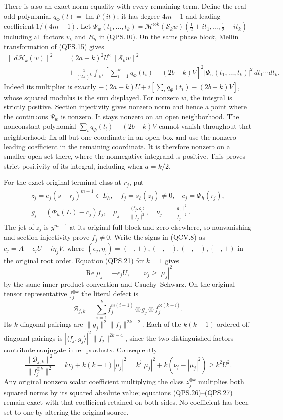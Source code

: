 There is also an exact norm equality with every remaining term.
Define the real odd polynomial \(q_\Phi(t)=\operatorname{Im}F(it)\);
it has degree \(4m+1\) and leading coefficient \(1/(4m+1)\).
Let
\(\Psi_w(t_1,\ldots,t_k)=
\mathcal M^{\otimes k}(\mathcal S_k w)
(\tfrac12+it_1,\ldots,\tfrac12+it_k)\), including all factors
\(v_h\) and \(R_h\) in (QPS.10). On the same phase block,
Mellin transformation of (QPS.15) gives
\[
 \begin{split}
 \|d\mathcal H_k(w)\|^2
   &=(2a-k)^2U^2\|\mathcal S_k w\|^2\\
   &\quad+\frac1{(2\pi)^k}\int_{\mathbb{R}^k}
    \left[\sum_{i=1}^kq_\Phi(t_i)-(2b-k)V\right]^2
                      |\Psi_w(t_1,\ldots,t_k)|^2\,dt_1\cdots dt_k.
 \end{split}
 \tag{QPS.23}
\]
Indeed its multiplier is exactly
\(-(2a-k)U+i[\sum_iq_\Phi(t_i)-(2b-k)V]\), whose squared
modulus is the sum displayed. For nonzero \(w\), the integral
is strictly positive. Section injectivity gives nonzero norm and
hence a point where the continuous \(\Psi_w\) is nonzero.
It stays nonzero on an open neighborhood. The nonconstant
polynomial \(\sum_iq_\Phi(t_i)-(2b-k)V\) cannot vanish throughout
that neighborhood: fix all but one coordinate in an open box
and use the nonzero leading coefficient in the remaining
coordinate. It is therefore nonzero on a smaller open set there,
where the nonnegative integrand is positive. This proves strict
positivity of its integral, including when \(a=k/2\).

For the exact original terminal class at \(r_j\), put
\[
 \begin{gathered}
 z_j=e_j(s-r_j)^{m-1}\in E_h,\quad
 f_j=s_h(z_j)\ne0,\quad
 c_j=\Phi_h(r_j),\\
 g_j=(\Phi_h(D)-c_j)f_j,\quad
 \mu_j=\frac{\langle f_j,g_j\rangle}{\|f_j\|^2},\quad
 \nu_j=\frac{\|g_j\|^2}{\|f_j\|^2}.
 \end{gathered}
 \tag{QPS.24}
\]
The jet of \(z_j\) is \(y^{m-1}\) at its original full block
and zero elsewhere, so nonvanishing and section injectivity
prove \(f_j\ne0\). Write the signs in (QCV.8) as
\(c_j=A+\epsilon_jU+i\eta_jV\), where
\((\epsilon_j,\eta_j)=(+,+),(+,-),(-,-),(-,+)\) in the original
root order. Equation (QPS.21) for \(k=1\) gives
\[
 \operatorname{Re}\mu_j=-\epsilon_jU,\qquad
 \nu_j\geq|\mu_j|^2
 \tag{QPS.25}
\]
by the same inner-product convention and Cauchy--Schwarz.
On the original tensor representative \(f_j^{\otimes k}\)
the literal defect is
\[
 \mathcal B_{j,k}
   =\sum_{i=1}^k
       f_j^{\otimes(i-1)}\otimes g_j\otimes f_j^{\otimes(k-i)}.
 \tag{QPS.26}
\]
Its \(k\) diagonal pairings are
\(\|g_j\|^2\|f_j\|^{2k-2}\). Each of the \(k(k-1)\) ordered
off-diagonal pairings is
\(|\langle f_j,g_j\rangle|^2\|f_j\|^{2k-4}\), since the two
distinguished factors contribute conjugate inner products.
Consequently
\[
 \frac{\|\mathcal B_{j,k}\|^2}{\|f_j^{\otimes k}\|^2}
   =k\nu_j+k(k-1)|\mu_j|^2
   =k^2|\mu_j|^2+k(\nu_j-|\mu_j|^2)
   \geq k^2U^2.
 \tag{QPS.27}
\]
Any original nonzero scalar coefficient multiplying the class
\(z_j^{\otimes k}\) multiplies both squared norms by its squared
absolute value; equations (QPS.26)--(QPS.27) remain exact with
that coefficient retained on both sides. No coefficient has
been set to one by altering the original source.

